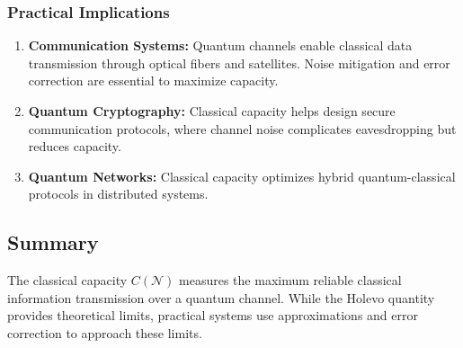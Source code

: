 \subsubsection{Practical Implications}
\begin{enumerate}
    \item \textbf{Communication Systems:} Quantum channels enable classical data transmission through optical fibers and satellites. Noise mitigation and error correction are essential to maximize capacity.
    \item \textbf{Quantum Cryptography:} Classical capacity helps design secure communication protocols, where channel noise complicates eavesdropping but reduces capacity.
    \item \textbf{Quantum Networks:} Classical capacity optimizes hybrid quantum-classical protocols in distributed systems.
\end{enumerate}

\subsection{Summary}
The classical capacity \(C(\mathcal{N})\) measures the maximum reliable classical information transmission over a quantum channel. While the Holevo quantity provides theoretical limits, practical systems use approximations and error correction to approach these limits.
